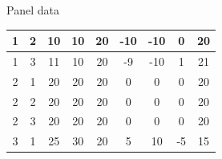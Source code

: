 \documentclass[usenames,dvipsnames]{beamer}
\begin{document}
\begin{frame}{Panel data}
\begin{table}[]
{\begin{tabular}{|c|c|c|c|c|c|c|c|c|}
1   & 2    & 10       & 10                                                        & 20                                                     & -10                                                         & -10                                                         & 0                                                          & 20                                                                      \\ \hline
1   & 3    & 11       & 10                                                        & 20                                                     & -9                                                          & -10                                                         & 1                                                          & 21                                                                      \\ \hline
2   & 1    & 20       & 20                                                        & 20                                                     & 0                                                           & 0                                                           & 0                                                          & 20                                                                      \\ \hline
2   & 2    & 20       & 20                                                        & 20                                                     & 0                                                           & 0                                                           & 0                                                          & 20                                                                      \\ \hline
2   & 3    & 20       & 20                                                        & 20                                                     & 0                                                           & 0                                                           & 0                                                          & 20                                                                      \\ \hline
3   & 1    & 25       & 30                                                        & 20                                                     & 5                                                           & 10                                                          & -5                                                         & 15                                                                      \\ \hline

\end{tabular}}
\end{table}
\end{frame}
\end{document}
